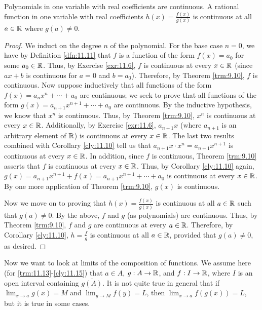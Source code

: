 \documentclass[../main.tex]{subfiles}
\begin{document}
\begin{corollary}\label{cly:11.12}
    Polynomials in one variable with real coefficients are continuous. A rational function in one variable with real coefficients $h(x)=\frac{f(x)}{g(x)}$ is continuous at all $a\in\mathbb{R}$ where $g(a)\neq 0$.
    \begin{proof}
        We induct on the degree $n$ of the polynomial. For the base case $n=0$, we have by Definition \ref{dfn:11.11} that $f$ is a function of the form $f(x)=a_0$ for some $a_0\in\mathbb{R}$. Thus, by Exercise \ref{exr:11.6}, $f$ is continuous at every $x\in\mathbb{R}$ (since $ax+b$ is continuous for $a=0$ and $b=a_0$). Therefore, by Theorem \ref{trm:9.10}, $f$ is continuous. Now suppose inductively that all functions of the form $f(x)=a_nx^n+\cdots+a_0$ are continuous; we seek to prove that all functions of the form $g(x)=a_{n+1}x^{n+1}+\cdots+a_0$ are continuous. By the inductive hypothesis, we know that $x^n$ is continuous. Thus, by Theorem \ref{trm:9.10}, $x^n$ is continuous at every $x\in\mathbb{R}$. Additionally, by Exercise \ref{exr:11.6}, $a_{n+1}x$ (where $a_{n+1}$ is an arbitrary element of $\mathbb{R}$) is continuous at every $x\in\mathbb{R}$. The last two results combined with Corollary \ref{cly:11.10} tell us that $a_{n+1}x\cdot x^n=a_{n+1}x^{n+1}$ is continuous at every $x\in\mathbb{R}$. In addition, since $f$ is continuous, Theorem \ref{trm:9.10} asserts that $f$ is continuous at every $x\in\mathbb{R}$. Thus, by Corollary \ref{cly:11.10} again, $g(x)=a_{n+1}x^{n+1}+f(x)=a_{n+1}x^{n+1}+\cdots+a_0$ is continuous at every $x\in\mathbb{R}$. By one more application of Theorem \ref{trm:9.10}, $g(x)$ is continuous.\par
        Now we move on to proving that $h(x)=\frac{f(x)}{g(x)}$ is continuous at all $a\in\mathbb{R}$ such that $g(a)\neq 0$. By the above, $f$ and $g$ (as polynomials) are continuous. Thus, by Theorem \ref{trm:9.10}, $f$ and $g$ are continuous at every $a\in\mathbb{R}$. Therefore, by Corollary \ref{cly:11.10}, $h=\frac{f}{g}$ is continuous at all $a\in\mathbb{R}$, provided that $g(a)\neq 0$, as desired.
    \end{proof}
\end{corollary}

Now we want to look at limits of the composition of functions. We assume here (for \ref{trm:11.13}-\ref{cly:11.15}) that $a\in A$, $g:A\to\mathbb{R}$, and $f:I\to\mathbb{R}$, where $I$ is an open interval containing $\overline{g(A)}$. It is not quite true in general that if $\lim_{x\to a}g(x)=M$ and $\lim_{y\to M}f(y)=L$, then $\lim_{x\to a}f(g(x))=L$, but it is true in some cases.
\end{document}
